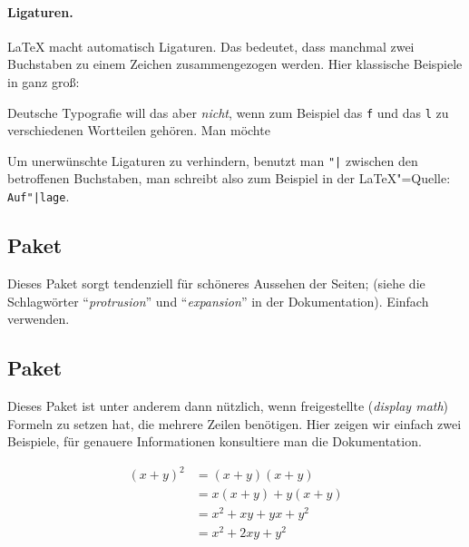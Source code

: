 \paragraph{Ligaturen.}

\LaTeX{} macht automatisch Ligaturen. Das bedeutet, dass manchmal zwei
Buchstaben zu einem Zeichen zusammengezogen werden. Hier klassische Beispiele
in ganz groß:
%
\begin{center}
  \scalebox{3}{fl ff ffl}
\end{center}
%
Deutsche Typografie will das aber \emph{nicht}, wenn zum Beispiel das \verb|f|
und das \verb|l| zu verschiedenen Wortteilen gehören.  Man möchte 
%
\begin{center}
\end{center}
%
Um unerwünschte Ligaturen zu verhindern, benutzt man \verb="|= zwischen den
betroffenen Buchstaben, man schreibt also zum Beispiel in der \LaTeX"=Quelle:
\verb=Auf"|lage=.

\subsection{Paket }

Dieses Paket sorgt tendenziell für schöneres Aussehen der Seiten; (siehe die
Schlagwörter "`\emph{protrusion}"' und "`\emph{expansion}"' in der
Dokumentation). Einfach verwenden.

\subsection{Paket }

Dieses Paket ist unter anderem dann nützlich, wenn freigestellte
(\emph{display math}) Formeln zu setzen hat, die mehrere Zeilen benötigen.
Hier zeigen wir einfach zwei Beispiele, für genauere Informationen konsultiere
man die Dokumentation. 

\begin{tcblisting}{}
  \begin{align*}
    (x+y)^2 &= (x+y) (x+y) \\
            &= x(x+y) + y(x+y) \\
            &= x^2 + xy + yx + y^2 \\
            &= x^2 + 2xy + y^2 \\
  \end{align*}
\end{tcblisting}

